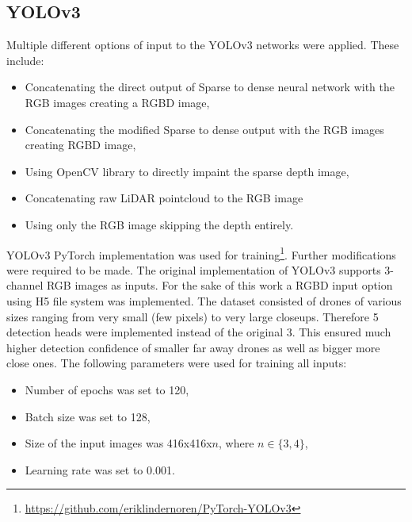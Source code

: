 \documentclass[twoside]{ctuthesis}
\theoremstyle{plain}
\theoremstyle{definition}
\theoremstyle{note}
\begin{document}
\subsection{YOLOv3}
Multiple different options of input to the YOLOv3 networks were applied. These include:
\begin{itemize}
	\item Concatenating the direct output of Sparse to dense neural network with the RGB images creating a RGBD image,
	\item Concatenating the modified Sparse to dense output with the RGB images creating RGBD image,
	\item Using OpenCV library to directly impaint the sparse depth image,
	\item Concatenating raw LiDAR pointcloud to the RGB image
	\item Using only the RGB image skipping the depth entirely.
\end{itemize}
YOLOv3 PyTorch implementation was used for training\footnote{\url{https://github.com/eriklindernoren/PyTorch-YOLOv3}}. Further modifications were required to be made. The original implementation of YOLOv3 supports 3-channel RGB images as inputs. For the sake of this work a RGBD input option using H5 file system was implemented. The dataset consisted of drones of various sizes ranging from very small (few pixels) to very large closeups. Therefore 5 detection heads were implemented instead of the original 3. This ensured much higher detection confidence of smaller far away drones as well as bigger more close ones. The following parameters were used for training all inputs:
\begin{itemize}
	\item Number of epochs was set to 120,
	\item Batch size was set to 128,
	\item Size of the input images was 416x416x$n$, where $n\in\{3,4\}$,
	\item Learning rate was set to 0.001.
\end{itemize}
\end{document}
